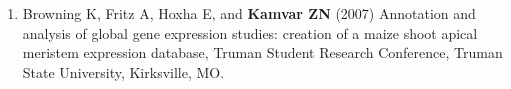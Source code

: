 \begin{enumerate}[leftmargin = 14pt]
	\vspace{3pt}

	\item Browning K, Fritz A, Hoxha E, and \textbf{Kamvar ZN} (2007) Annotation
	and analysis of global gene expression studies: creation of a maize shoot
	apical meristem expression database, Truman Student Research Conference,
	Truman State University, Kirksville, MO.

\end{enumerate}








